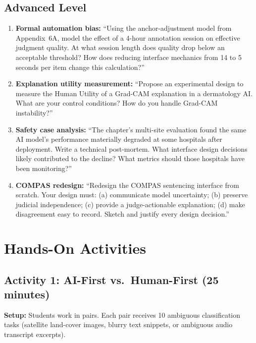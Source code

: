 \subsection{Advanced Level}

\begin{enumerate}
    \item \textbf{Formal automation bias:} ``Using the anchor-adjustment model from Appendix~6A, model the effect of a 4-hour annotation session on effective judgment quality. At what session length does quality drop below an acceptable threshold? How does reducing interface mechanics from 14 to 5 seconds per item change this calculation?''

    \item \textbf{Explanation utility measurement:} ``Propose an experimental design to measure the Human Utility of a Grad-CAM explanation in a dermatology AI. What are your control conditions? How do you handle Grad-CAM instability?''

    \item \textbf{Safety case analysis:} ``The chapter's multi-site evaluation found the same AI model's performance materially degraded at some hospitals after deployment. Write a technical post-mortem. What interface design decisions likely contributed to the decline? What metrics should those hospitals have been monitoring?''

    \item \textbf{COMPAS redesign:} ``Redesign the COMPAS sentencing interface from scratch. Your design must: (a) communicate model uncertainty; (b) preserve judicial independence; (c) provide a judge-actionable explanation; (d) make disagreement easy to record. Sketch and justify every design decision.''
\end{enumerate}

\section{Hands-On Activities}

\subsection{Activity 1: AI-First vs.\ Human-First (25 minutes)}

\textbf{Setup:} Students work in pairs. Each pair receives 10 ambiguous classification tasks (satellite land-cover images, blurry text snippets, or ambiguous audio transcript excerpts).

